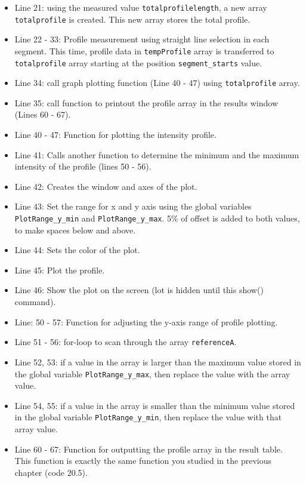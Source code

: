 \documentclass[11pt,a4paper,oneside]{report}
\newcommand{\ilcom}[1]{\texttt{\small#1}}
\begin{document}
\begin{itemize}
\item Line 21: using the measured value \ilcom{totalprofilelength}, a new array \ilcom{totalprofile} is created. This new array stores the total profile. 

\item Line 22 - 33: Profile measurement using straight line selection in each segment. This time, profile data in \ilcom{tempProfile} array is transferred to \ilcom{totalprofile} array starting at the position \ilcom{segment\_starts} value. 

\item Line 34: call graph plotting function (Line 40 - 47) using \ilcom{totalprofile} array.

\item Line 35: call function to printout the profile array in the results window (Lines 60 - 67). 

\item Line 40 - 47: Function for plotting the intensity profile.
\item Line 41: Calls another function to determine the minimum and the maximum intensity of the profile (lines 50 - 56). 
\item Line 42: Creates the window and axes of the plot. 
\item Line 43: Set the range for x and y axis using the global variables \ilcom{PlotRange\_y\_min}  and \ilcom{PlotRange\_y\_max}. 5\% of offset is added to both values, to make spaces below and above. 
\item Line 44: Sets the color of the plot. 
\item Line 45: Plot the profile. 
\item Line 46: Show the plot on the screen (lot is hidden until this show() command).

\item Line: 50 - 57: Function for adjusting the y-axis range of profile plotting. 
\item Line 51 - 56: for-loop to scan through the array \ilcom{referenceA}. 
\item Line 52, 53: if a value in the array is larger than the maximum value stored in the global variable \ilcom{PlotRange\_y\_max}, then replace the value with the array value. 
\item Line 54, 55: if a value in the array is smaller than the minimum value stored in the global variable \ilcom{PlotRange\_y\_min}, then replace the value with that array value. 

\item Line 60 - 67: Function for outputting the profile array in the result table.  This function is exactly the same function you studied in the previous chapter (code 20.5).

\end{itemize}
\end{document}
